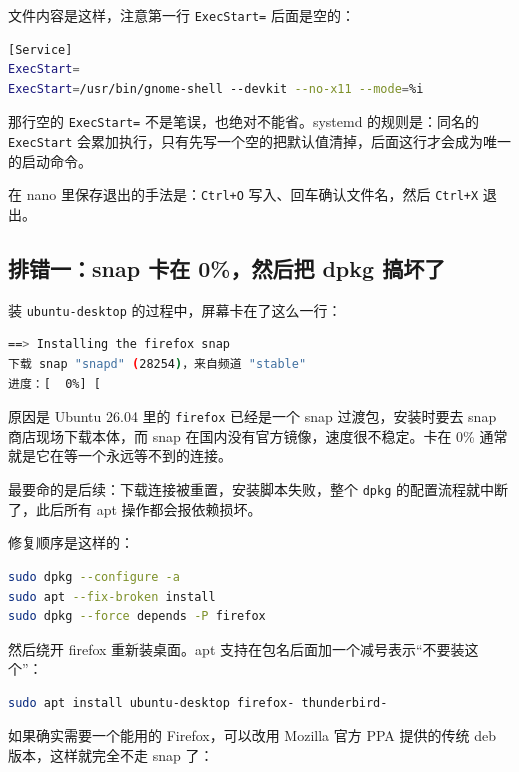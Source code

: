\documentclass[12pt,a4paper]{ctexbook}
\begin{document}
文件内容是这样，注意第一行 \verb|ExecStart=| 后面是空的：

\begin{lstlisting}[language=bash,title={override.conf}]
[Service]
ExecStart=
ExecStart=/usr/bin/gnome-shell --devkit --no-x11 --mode=%i
\end{lstlisting}

那行空的 \verb|ExecStart=| 不是笔误，也绝对不能省。systemd 的规则是：同名的 \verb|ExecStart| 会累加执行，只有先写一个空的把默认值清掉，后面这行才会成为唯一的启动命令。

在 nano 里保存退出的手法是：\verb|Ctrl+O| 写入、回车确认文件名，然后 \verb|Ctrl+X| 退出。

\subsection{排错一：snap 卡在 0\%，然后把 dpkg 搞坏了}

装 \verb|ubuntu-desktop| 的过程中，屏幕卡在了这么一行：

\begin{lstlisting}[language=bash,title={卡住的 snap 下载}]
==> Installing the firefox snap
下载 snap "snapd" (28254)，来自频道 "stable"
进度：[  0%] [
\end{lstlisting}

原因是 Ubuntu 26.04 里的 \verb|firefox| 已经是一个 snap 过渡包，安装时要去 snap 商店现场下载本体，而 snap 在国内没有官方镜像，速度很不稳定。卡在 0\% 通常就是它在等一个永远等不到的连接。

最要命的是后续：下载连接被重置，安装脚本失败，整个 \verb|dpkg| 的配置流程就中断了，此后所有 apt 操作都会报依赖损坏。

修复顺序是这样的：

\begin{lstlisting}[language=bash,title={修复被中断的 dpkg，并强制移除坏掉的 firefox}]
sudo dpkg --configure -a
sudo apt --fix-broken install
sudo dpkg --force depends -P firefox
\end{lstlisting}

然后绕开 firefox 重新装桌面。apt 支持在包名后面加一个减号表示``不要装这个''：

\begin{lstlisting}[language=bash,title={排除 firefox 和 thunderbird 再装桌面}]
sudo apt install ubuntu-desktop firefox- thunderbird-
\end{lstlisting}

如果确实需要一个能用的 Firefox，可以改用 Mozilla 官方 PPA 提供的传统 deb 版本，这样就完全不走 snap 了：
\end{document}
